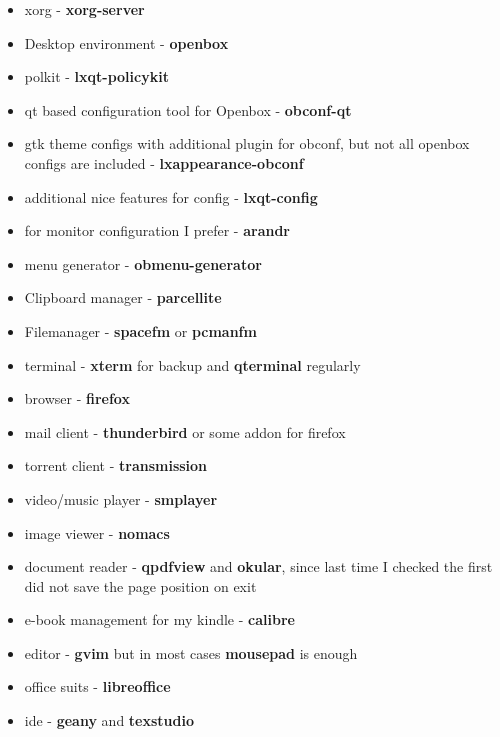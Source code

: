 \documentclass[10pt,a4paper]{article}
\begin{document}
                    \begin{itemize}
                        \item xorg - \textbf{xorg-server}
                        \item Desktop environment - \textbf{openbox}
                        \item polkit - \textbf{lxqt-policykit}
                        \item qt based configuration tool for Openbox - \textbf{obconf-qt}
                        \item gtk theme configs with additional plugin for obconf, but not all openbox configs are included - \textbf{lxappearance-obconf}
                        \item additional nice features for config - \textbf{lxqt-config}
                        \item for monitor configuration I prefer - \textbf{arandr}
                        \item menu generator - \textbf{obmenu-generator}
                        \item Clipboard manager - \textbf{parcellite}
                        \item Filemanager - \textbf{spacefm} or \textbf{pcmanfm}
                        \item terminal - \textbf{xterm} for backup and \textbf{qterminal} regularly
                        \item browser - \textbf{firefox}
                        \item mail client - \textbf{thunderbird} or some addon for firefox
                        \item torrent client - \textbf{transmission}
                        \item video/music player - \textbf{smplayer}
                        \item image viewer - \textbf{nomacs}
                        \item document reader - \textbf{qpdfview} and \textbf{okular}, since last time I checked the first did not save the page position on exit
                        \item e-book management for my kindle - \textbf{calibre}
                        \item editor - \textbf{gvim} but in most cases \textbf{mousepad} is enough
                        \item office suits - \textbf{libreoffice}
                        \item ide - \textbf{geany} and \textbf{texstudio}

\end{itemize}
\end{document}
